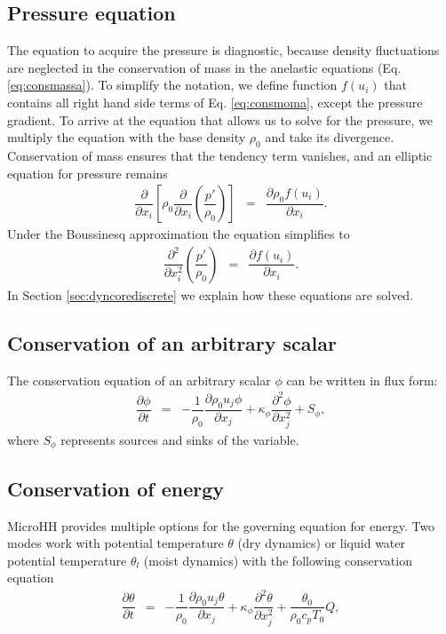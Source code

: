 \documentclass[gmd]{copernicus}
\begin{document}
\subsection{Pressure equation}
The equation to acquire the pressure is diagnostic, because density fluctuations are neglected in the conservation of mass in the anelastic equations (Eq. \ref{eq:consmassa}). To simplify the notation, we define function $f \left( u_i \right)$ that contains all right hand side terms of Eq. \ref{eq:consmoma}, except the pressure gradient. To arrive at the equation that allows us to solve for the pressure, we multiply the equation with the base density $\rho_0$ and take its divergence. Conservation of mass ensures that the tendency term vanishes, and an elliptic equation for pressure remains
\begin{eqnarray}
\dfrac{\partial}{\partial x_i} 
\left[ \rho_0 \dfrac{\partial}{\partial x_i} \left( \dfrac{p'}{\rho_0} \right) \right] & = &
\dfrac{\partial \rho_0 f \left( u_i \right)}{\partial x_i}.\label{eq:presa}
\end{eqnarray}
Under the Boussinesq approximation the equation simplifies to
\begin{eqnarray}
\dfrac{\partial^2}{\partial x_i^2} \left( \dfrac{p'}{\rho_0} \right) & = &
\dfrac{\partial f \left( u_i \right)}{\partial x_i}.\label{eq:presb}
\end{eqnarray}
In Section \ref{sec:dyncorediscrete} we explain how these equations are solved.

\subsection{Conservation of an arbitrary scalar}
The conservation equation of an arbitrary scalar $\phi$ can be written in flux form:
\begin{eqnarray}
\dfrac{\partial \phi}{\partial t} & = & - \dfrac{1}{\rho_0} \dfrac{\partial \rho_0 u_j \phi}{\partial x_j} +
\kappa_\phi \dfrac{\partial^2 \phi}{\partial x_j^2} + S_\phi, \label{eq:consscal}
\end{eqnarray}
where $S_\phi$ represents sources and sinks of the variable.

\subsection{Conservation of energy}
MicroHH provides multiple options for the governing equation for energy. Two modes work with potential temperature $\theta$ (dry dynamics) or liquid water potential temperature $\theta_l$ (moist dynamics) with the following conservation equation
\begin{eqnarray}
\dfrac{\partial \theta}{\partial t} & = & - \dfrac{1}{\rho_0} \dfrac{\partial \rho_0 u_j \theta}{\partial x_j} + \kappa_\phi \dfrac{\partial^2 \theta}{\partial x_j^2} + \dfrac{\theta_0}{\rho_0 c_p T_0} Q,
\end{eqnarray}
\end{document}
